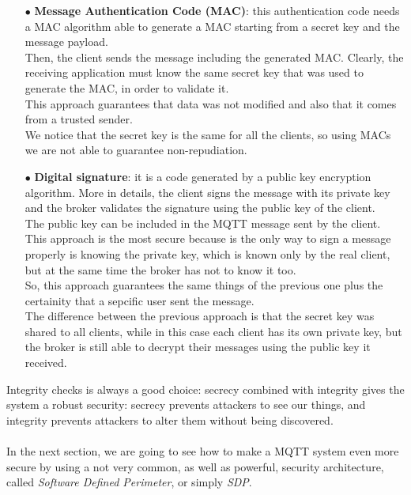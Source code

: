\documentclass[12pt]{report}
\begin{document}
{\begin{itemize}
\item[$\bullet$] \textbf{Message Authentication Code (MAC)}: this authentication code needs a MAC algorithm able to generate a MAC starting from a secret key and the message payload.\\
Then, the client sends the message including the generated MAC.
Clearly, the receiving application must know the same secret key that was used to generate the MAC, in order to validate it.\\
This approach guarantees that data was not modified and also that it comes from a trusted sender.\\
We notice that the secret key is the same for all the clients, so using MACs we are not able to guarantee non-repudiation.

\item[$\bullet$] \textbf{Digital signature}: it is a code generated by a public key encryption algorithm. More in details, the client signs the message with its private key and the broker validates the signature using the public key of the client.\\
The public key can be included in the MQTT message sent by the client.\\
This approach is the most secure because is the only way to sign a message properly is knowing the private key, which is known only by the real client, but at the same time the broker has not to know it too.\\
So, this approach guarantees the same things of the previous one plus the certainity that a sepcific user sent the message.\\
The difference between the previous approach is that the secret key was shared to all clients, while in this case each client has its own private key, but the broker is still able to decrypt their messages using the public key it received.\\
\end{itemize}

Integrity checks is always a good choice: secrecy combined with integrity gives the system a robust security: secrecy prevents attackers to see our things, and integrity prevents attackers to alter them without being discovered.\\\\
In the next section, we are going to see how to make a MQTT system even more secure by using a not very common, as well as powerful, security architecture, called \textit{Software Defined Perimeter}, or simply \textit{SDP}.\\


}
\end{document}

